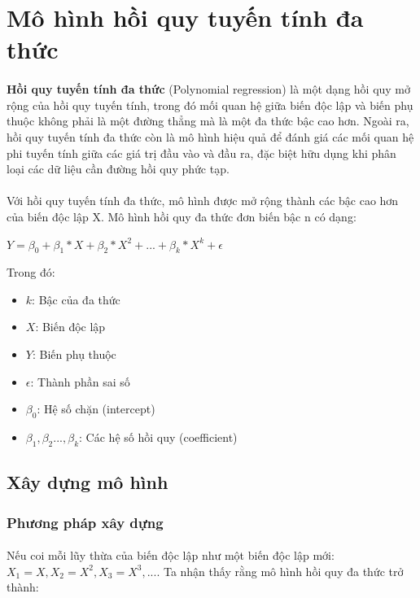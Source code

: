 \newpage
\section{Mô hình hồi quy tuyến tính đa thức}

\paragraph{}{\textbf{Hồi quy tuyến tính đa thức} \cite{ostertagova2012modelling} (Polynomial regression) là một dạng hồi quy mở rộng của hồi quy tuyến tính, trong đó mối quan hệ giữa biến độc lập và biến phụ thuộc không phải là một đường thẳng mà là một đa thức bậc cao hơn. Ngoài ra, hồi quy tuyến tính đa thức còn là mô hình hiệu quả để đánh giá các mối quan hệ phi tuyến tính giữa các giá trị đầu vào và đầu ra, đặc biệt hữu dụng khi phân loại các dữ liệu cần đường hồi quy phức tạp.}

\paragraph{}{Với hồi quy tuyến tính đa thức, mô hình được mở rộng thành các bậc cao hơn của biến độc lập X. Mô hình hồi quy đa thức đơn biến bậc n có dạng:}

\begin{center}
\large $Y = \beta_0+\beta_1*X+\beta_2*X^2+...+\beta_k*X^k + \epsilon$
\end{center}

Trong đó:
\begin{itemize}
    \item $k$: Bậc của đa thức
    \item $X$: Biến độc lập
    \item $Y$: Biến phụ thuộc
    \item $\epsilon$: Thành phần sai số
    \item $\beta_0$: Hệ số chặn (intercept)
    \item $\beta_1,\beta_2...,\beta_k$: Các hệ số hồi quy (coefficient)
\end{itemize}

\subsection{Xây dựng mô hình}
\subsubsection{Phương pháp xây dựng}

\paragraph{}{Nếu coi mỗi lũy thừa của biến độc lập như một biến độc lập mới: $X_1 = X, X_2 = X^2, X_3 = X^3, ...$. Ta nhận thấy rằng mô hình hồi quy đa thức trở thành:}

